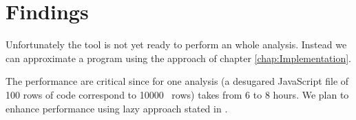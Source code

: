 \section{Findings}
\label{sec:Findings}
Unfortunately the tool is not yet ready to perform an whole analysis. Instead we can approximate a program using the approach of chapter \ref{chap:Implementation}.

The performance are critical since for one analysis (a desugared JavaScript file of 100 rows of code correspond to 10000 \ljs\ rows) takes from 6 to 8 hours. We plan to enhance performance using lazy approach stated in \cite{TAJS, TAJSDOM, TAJSLazy}.


